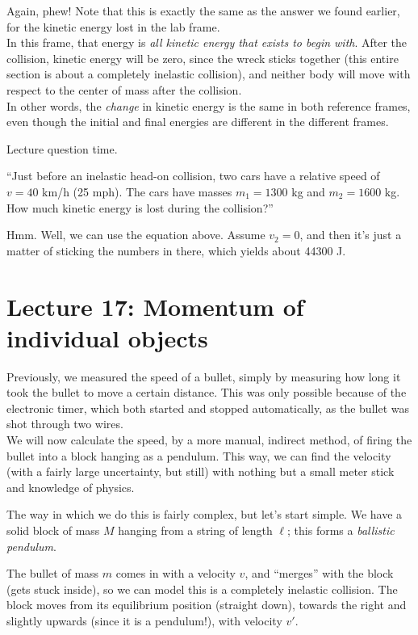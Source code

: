 Again, phew! Note that this is exactly the same as the answer we found earlier, for the kinetic energy lost in the lab frame.\\
In this frame, that energy is \emph{all kinetic energy that exists to begin with}. After the collision, kinetic energy will be zero, since the wreck sticks together (this entire section is about a completely inelastic collision), and neither body will move with respect to the center of mass after the collision.\\
In other words, the \emph{change} in kinetic energy is the same in both reference frames, even though the initial and final energies are different in the different frames.

Lecture question time.

``Just before an inelastic head-on collision, two cars have a relative speed of $v = 40$ km/h (25 mph). The cars have masses $m_1 = 1300$ kg and $m_2 = 1600$ kg.\\
How much kinetic energy is lost during the collision?''

Hmm. Well, we can use the equation above. Assume $v_2 = 0$, and then it's just a matter of sticking the numbers in there, which yields about 44300 J.

\section{Lecture 17: Momentum of individual objects}

Previously, we measured the speed of a bullet, simply by measuring how long it took the bullet to move a certain distance. This was only possible because of the electronic timer, which both started and stopped automatically, as the bullet was shot through two wires.\\
We will now calculate the speed, by a more manual, indirect method, of firing the bullet into a block hanging as a pendulum. This way, we can find the velocity (with a fairly large uncertainty, but still) with nothing but a small meter stick and knowledge of physics.

The way in which we do this is fairly complex, but let's start simple. We have a solid block of mass $M$ hanging from a string of length $\ell$; this forms a \emph{ballistic pendulum}.

The bullet of mass $m$ comes in with a velocity $v$, and ``merges'' with the block (gets stuck inside), so we can model this is a completely inelastic collision. The block moves from its equilibrium position (straight down), towards the right and slightly upwards (since it is a pendulum!), with velocity $v'$.

